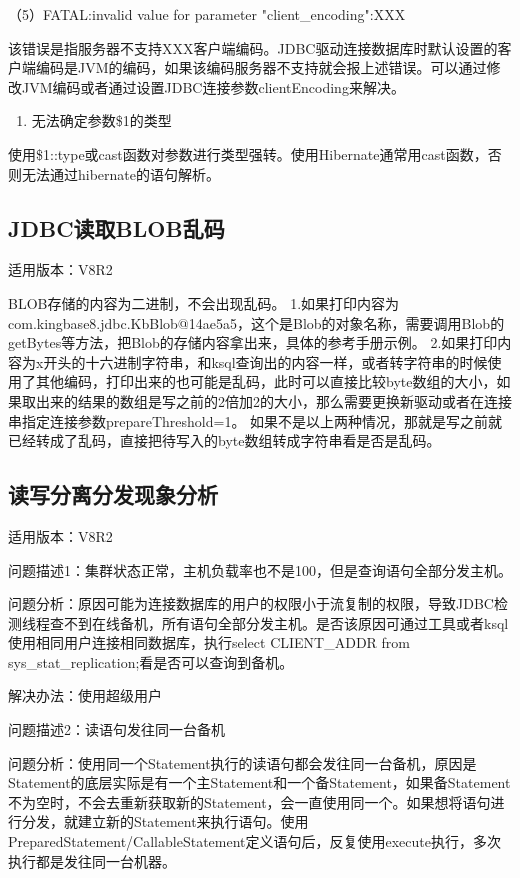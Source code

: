 \documentclass[a4,10pt,oneside,english]{sphinxmanual}
\begin{document}
（5）FATAL:invalid value for parameter "client\_encoding":XXX

该错误是指服务器不支持XXX客户端编码。JDBC驱动连接数据库时默认设置的客户端编码是JVM的编码，如果该编码服务器不支持就会报上述错误。可以通过修改JVM编码或者通过设置JDBC连接参数clientEncoding来解决。
\begin{enumerate}
%
\setcounter{enumi}{7}
\item {} 
无法确定参数\$1的类型

\end{enumerate}

使用\$1::type或cast函数对参数进行类型强转。使用Hibernate通常用cast函数，否则无法通过hibernate的语句解析。


\subsection{JDBC读取BLOB乱码}
\label{\detokenize{interface/jdbc:jdbcblob}}
适用版本：V8R2

BLOB存储的内容为二进制，不会出现乱码。
1.如果打印内容为com.kingbase8.jdbc.KbBlob@14ae5a5，这个是Blob的对象名称，需要调用Blob的getBytes等方法，把Blob的存储内容拿出来，具体的参考手册示例。
2.如果打印内容为x开头的十六进制字符串，和ksql查询出的内容一样，或者转字符串的时候使用了其他编码，打印出来的也可能是乱码，此时可以直接比较byte数组的大小，如果取出来的结果的数组是写之前的2倍加2的大小，那么需要更换新驱动或者在连接串指定连接参数prepareThreshold=\sphinxhyphen{}1。
如果不是以上两种情况，那就是写之前就已经转成了乱码，直接把待写入的byte数组转成字符串看是否是乱码。


\subsection{读写分离分发现象分析}
\label{\detokenize{interface/jdbc:id15}}
适用版本：V8R2

问题描述1：集群状态正常，主机负载率也不是100，但是查询语句全部分发主机。

问题分析：原因可能为连接数据库的用户的权限小于流复制的权限，导致JDBC检测线程查不到在线备机，所有语句全部分发主机。是否该原因可通过工具或者ksql使用相同用户连接相同数据库，执行select CLIENT\_ADDR from sys\_stat\_replication;看是否可以查询到备机。

解决办法：使用超级用户

问题描述2：读语句发往同一台备机

问题分析：使用同一个Statement执行的读语句都会发往同一台备机，原因是Statement的底层实际是有一个主Statement和一个备Statement，如果备Statement不为空时，不会去重新获取新的Statement，会一直使用同一个。如果想将语句进行分发，就建立新的Statement来执行语句。使用PreparedStatement/CallableStatement定义语句后，反复使用execute执行，多次执行都是发往同一台机器。
\end{document}
